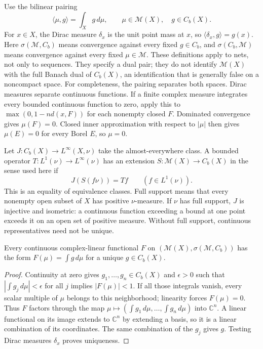 Use the bilinear pairing
\[
\langle\mu,g\rangle=\int_X g\,d\mu,
\qquad \mu\in\mathcal M(X),\quad g\in C_b(X).
\]
For $x\in X$, the Dirac measure $\delta_x$ is the unit point mass at
$x$, so $\langle\delta_x,g\rangle=g(x)$.
Here $\sigma(\mathcal M,C_b)$ means convergence against every fixed
$g\in C_b$, and $\sigma(C_b,\mathcal M)$ means convergence against
every fixed $\mu\in\mathcal M$. These definitions apply to nets,
not only to sequences. They specify a dual pair; they do not identify
$\mathcal M(X)$ with the full Banach dual of $C_b(X)$, an identification
that is generally false on a noncompact space.
For completeness, the pairing separates both spaces. Dirac measures
separate continuous functions. If a finite complex measure integrates
every bounded continuous function to zero, apply this to
$\max(0,1-n d(x,F))$ for each nonempty closed $F$. Dominated convergence
gives $\mu(F)=0$. Closed inner approximation with respect to $|\mu|$
then gives $\mu(E)=0$ for every Borel $E$, so $\mu=0$.

Let $J:C_b(X)\to L^\infty(X,\nu)$ take the almost-everywhere class.
A bounded operator $T:L^1(\nu)\to L^\infty(\nu)$ has an extension
$S:\mathcal M(X)\to C_b(X)$ in the sense used here if
\[
J(S(f\nu))=Tf\qquad(f\in L^1(\nu)).
\]
This is an equality of equivalence classes. Full support means that
every nonempty open subset of $X$ has positive $\nu$-measure.
If $\nu$ has full support,
$J$ is injective and isometric: a continuous function exceeding a bound
at one point exceeds it on an open set of positive measure. Without
full support, continuous representatives need not be unique.

\begin{lemma}
\label{lem:kernel_weak_dual}
Every continuous complex-linear functional $F$ on
$(\mathcal M(X),\sigma(\mathcal M,C_b))$ has the form
$F(\mu)=\int g\,d\mu$ for a unique $g\in C_b(X)$.
\end{lemma}
\begin{proof}
Continuity at zero gives $g_1,\ldots,g_n\in C_b(X)$ and
$\epsilon>0$ such that $|\int g_j\,d\mu|<\epsilon$ for all $j$
implies $|F(\mu)|<1$. If all those integrals vanish, every scalar
multiple of $\mu$ belongs to this neighborhood; linearity forces
$F(\mu)=0$. Thus $F$ factors through the map
$\mu\mapsto(\int g_1\,d\mu,\ldots,\int g_n\,d\mu)$ into
$\mathbb C^n$. A linear functional on its image extends to
$\mathbb C^n$ by extending a basis, so it is a linear combination
of its coordinates. The same combination of the $g_j$ gives $g$.
Testing Dirac measures $\delta_x$ proves uniqueness.
\end{proof}

